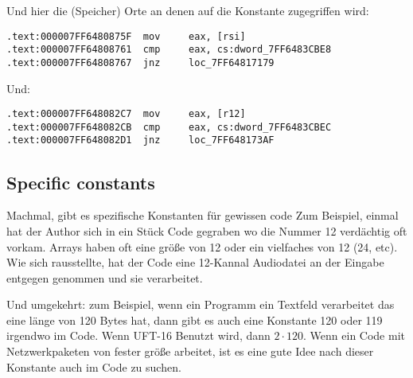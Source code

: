 Und hier die (Speicher) Orte an denen auf die Konstante zugegriffen wird:

\begin{lstlisting}[caption=dhcpcore.dll (Windows 7 x64),style=customasmx86]
.text:000007FF6480875F  mov     eax, [rsi]
.text:000007FF64808761  cmp     eax, cs:dword_7FF6483CBE8
.text:000007FF64808767  jnz     loc_7FF64817179
\end{lstlisting}

Und:

\begin{lstlisting}[caption=dhcpcore.dll (Windows 7 x64),style=customasmx86]
.text:000007FF648082C7  mov     eax, [r12]
.text:000007FF648082CB  cmp     eax, cs:dword_7FF6483CBEC
.text:000007FF648082D1  jnz     loc_7FF648173AF
\end{lstlisting}

\subsection{Specific constants}

Machmal, gibt es spezifische Konstanten für gewissen code %
Zum Beispiel, einmal hat der Author sich in ein Stück Code gegraben wo die Nummer 12 verdächtig
oft vorkam. Arrays haben oft eine größe von 12 oder ein vielfaches von 12 (24, etc). 
Wie sich rausstellte, hat der Code eine 12-Kannal Audiodatei an der Eingabe entgegen genommen und
sie verarbeitet.


Und umgekehrt: zum Beispiel, wenn ein Programm ein Textfeld verarbeitet das eine länge von 120 Bytes hat,
dann gibt es auch eine Konstante 120 oder 119 irgendwo im Code.
Wenn UFT-16 Benutzt wird, dann $2 \cdot 120$. Wenn ein Code mit Netzwerkpaketen von fester größe
arbeitet, ist es eine gute Idee nach dieser Konstante auch im Code zu suchen.


